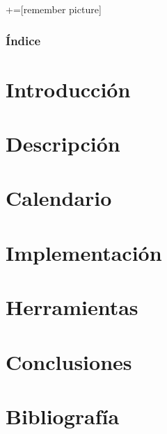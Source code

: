 \documentclass[9pt,xcolor=svgnames]{beamer}
\begin{document}
+=[remember picture]
\everymath{\displaystyle}

\begin{frame}
  \titlepage
\end{frame}

\normalsize

\begin{frame}
 \frametitle{Índice} 
 \tableofcontents
\end{frame}

\section{Introducción}


\section{Descripción}


\section{Calendario}


\section{Implementación}


\section{Herramientas}


\section{Conclusiones}


%

\section{Bibliografía}


\end{document}
